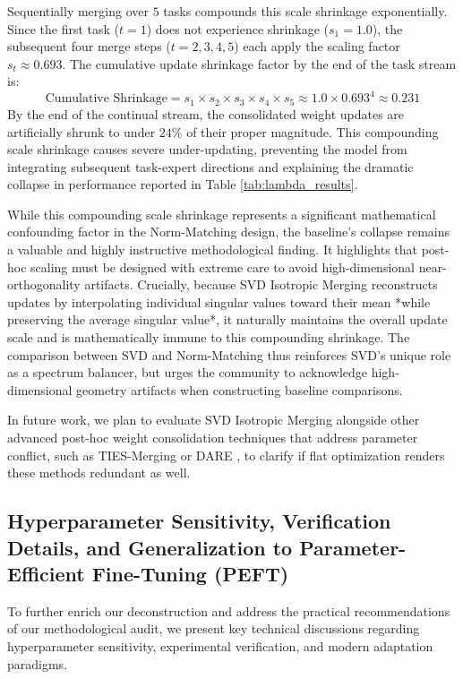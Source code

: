 \documentclass{article}
\theoremstyle{plain}
\theoremstyle{definition}
\theoremstyle{remark}
\begin{document}
Sequentially merging over $5$ tasks compounds this scale shrinkage exponentially. Since the first task ($t=1$) does not experience shrinkage ($s_1 = 1.0$), the subsequent four merge steps ($t=2, 3, 4, 5$) each apply the scaling factor $s_t \approx 0.693$. The cumulative update shrinkage factor by the end of the task stream is:
\begin{equation}
  \text{Cumulative Shrinkage} = s_1 \times s_2 \times s_3 \times s_4 \times s_5 \approx 1.0 \times 0.693^4 \approx 0.231
\end{equation}
By the end of the continual stream, the consolidated weight updates are artificially shrunk to under $24\%$ of their proper magnitude. This compounding scale shrinkage causes severe under-updating, preventing the model from integrating subsequent task-expert directions and explaining the dramatic collapse in performance reported in Table \ref{tab:lambda_results}.

While this compounding scale shrinkage represents a significant mathematical confounding factor in the Norm-Matching design, the baseline's collapse remains a valuable and highly instructive methodological finding. It highlights that post-hoc scaling must be designed with extreme care to avoid high-dimensional near-orthogonality artifacts. Crucially, because SVD Isotropic Merging reconstructs updates by interpolating individual singular values toward their mean *while preserving the average singular value*, it naturally maintains the overall update scale and is mathematically immune to this compounding shrinkage. The comparison between SVD and Norm-Matching thus reinforces SVD's unique role as a spectrum balancer, but urges the community to acknowledge high-dimensional geometry artifacts when constructing baseline comparisons.

In future work, we plan to evaluate SVD Isotropic Merging alongside other advanced post-hoc weight consolidation techniques that address parameter conflict, such as TIES-Merging \cite{tiesmerging} or DARE \cite{dare}, to clarify if flat optimization renders these methods redundant as well.

\subsection{Hyperparameter Sensitivity, Verification Details, and Generalization to Parameter-Efficient Fine-Tuning (PEFT)}
\label{sec:appendix_sensitivity}

To further enrich our deconstruction and address the practical recommendations of our methodological audit, we present key technical discussions regarding hyperparameter sensitivity, experimental verification, and modern adaptation paradigms.
\end{document}
